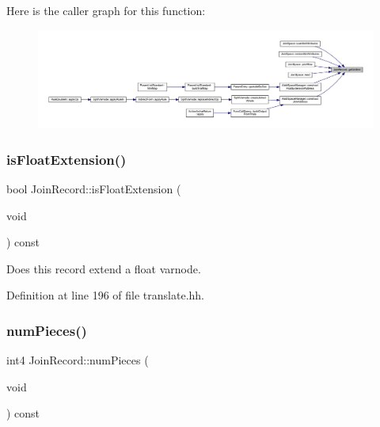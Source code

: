 Here is the caller graph for this function\+:
\nopagebreak
\begin{figure}[H]
\begin{center}
\leavevmode
\includegraphics[width=350pt]{class_join_record_a71e39715b107db55fa5c737457877b3a_icgraph}
\end{center}
\end{figure}
\mbox{\label{class_join_record_a0a9314d1dd21efb75d8851aa05c387c4}} 
\subsubsection{\texorpdfstring{isFloatExtension()}{isFloatExtension()}}
{\footnotesize\ttfamily bool Join\+Record\+::is\+Float\+Extension (\begin{DoxyParamCaption}\item[{void}]{ }\end{DoxyParamCaption}) const\hspace{0.3cm}{\ttfamily [inline]}}



Does this record extend a float varnode. 



Definition at line 196 of file translate.\+hh.

\mbox{\label{class_join_record_a18d9eb13c87a49511865fab244aa69f5}} 
\subsubsection{\texorpdfstring{numPieces()}{numPieces()}}
{\footnotesize\ttfamily int4 Join\+Record\+::num\+Pieces (\begin{DoxyParamCaption}\item[{void}]{ }\end{DoxyParamCaption}) const\hspace{0.3cm}{\ttfamily [inline]}}



